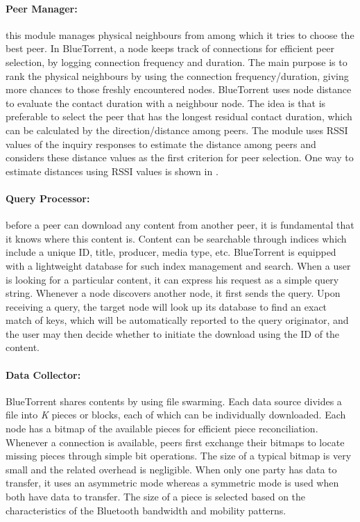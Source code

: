 \paragraph{Peer Manager:}
this module manages physical neighbours from among which it tries to choose the best peer. In BlueTorrent, a node keeps track of connections for efficient peer selection, by logging connection frequency and duration. The main purpose is to rank the physical neighbours by using the connection frequency/duration, giving more chances to those freshly encountered nodes. BlueTorrent uses node distance to evaluate the contact duration with a neighbour node. The idea is that is preferable to select the peer that has the longest residual contact duration, which can be calculated by the direction/distance among peers. The module uses RSSI values of the inquiry responses to estimate the distance among peers and considers these distance values as the first criterion for peer selection. One way to estimate distances using RSSI values is shown in \cite{positionBluetooth}.

\paragraph{Query Processor:}
before a peer can download any content from another peer, it is fundamental that it knows where this content is. Content can be searchable through indices which include a unique ID, title, producer, media type, etc. BlueTorrent is equipped with a lightweight database for such index management and search. When a user is looking for a particular content, it can express his request as a simple query string. Whenever a node discovers another node, it first sends the query. Upon receiving a query, the target node will look up its database to find an exact match of keys, which will be automatically reported to the query originator, and the user may then decide whether to initiate the download using the ID of the content.

\paragraph{Data Collector:}
BlueTorrent shares contents by using file swarming. Each data source divides a file into \textit{K} pieces or blocks, each of which can be individually downloaded. Each node has a bitmap of the available pieces for efficient piece reconciliation. Whenever a connection is available, peers first exchange their bitmaps to locate missing pieces through simple bit operations. The size of a typical bitmap is very small and the related overhead is negligible. When only one party has data to transfer, it uses an asymmetric mode whereas a symmetric mode is used when both have data to transfer. The size of a piece is selected based on the characteristics of the Bluetooth bandwidth and mobility patterns. 






